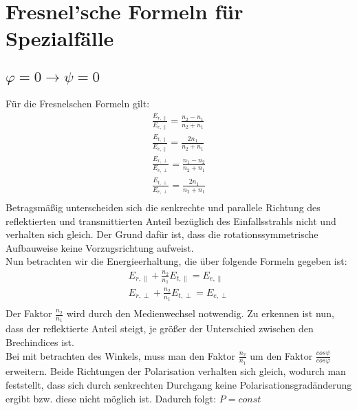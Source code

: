 \section{Fresnel'sche Formeln für  Spezialfälle }
\subsection*{$\varphi=0\rightarrow\psi=0$}
Für die Fresnelschen Formeln gilt:
\begin{align*}
\frac{E_{r,\parallel}}{E_{e,\parallel}}=\frac{n_2-n_1}{n_2+n_1}\\
\frac{E_{t,\parallel}}{E_{e,\parallel}}=\frac{2n_1}{n_2+n_1}\\
\frac{E_{r,\perp}}{E_{e,\perp}}=\frac{n_1-n_2}{n_2+n_1}\\
\frac{E_{t,\perp}}{E_{e,\perp}}=\frac{2n_1}{n_2+n_1}\\
\end{align*}
Betragsmäßig unterscheiden sich die senkrechte und parallele Richtung des reflektierten und transmittierten Anteil bezüglich des Einfallsstrahls nicht und verhalten sich gleich. Der Grund dafür ist, dass die rotationssymmetrische Aufbauweise keine Vorzugsrichtung aufweist. \\
Nun betrachten wir die Energieerhaltung, die über folgende Formeln gegeben ist:
\begin{align*}
E_{r,\parallel}+\frac{n_2}{n_1}E_{t,\parallel}=E_{e,\parallel}\\
E_{r,\perp}+\frac{n_2}{n_1}E_{t,\perp}=E_{e,\perp}\\
\end{align*}
Der Faktor $\frac{n_2}{n_1}$ wird durch den Medienwechsel notwendig. Zu erkennen ist nun, dass der reflektierte Anteil steigt, je größer der Unterschied zwischen den Brechindices ist. \\
Bei mit betrachten des Winkels, muss man den Faktor $\frac{n_2}{n_1}$  um den Faktor $\frac{cos\psi}{cos\varphi}$ erweitern. 
Beide Richtungen der Polarisation verhalten sich gleich, wodurch man feststellt, dass sich durch senkrechten Durchgang keine Polarisationsgradänderung ergibt bzw. diese nicht möglich ist. Dadurch folgt: $P=const$

